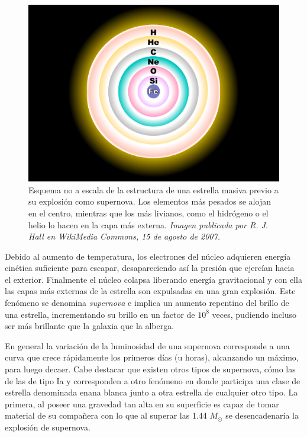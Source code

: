 \begin{figure}[h!]
\centering
\includegraphics[scale=.25]{images/sncore}
\caption{Esquema no a escala de la estructura de una estrella masiva previo a su explosi\'on como supernova. Los elementos m\'as pesados se alojan en el centro, mientras que  los m\'as livianos, como el hidr\'ogeno o el helio lo hacen en la capa m\'as externa. \textit{Imagen publicada por R. J. Hall en WikiMedia Commons, 15 de agosto de 2007.}}
\label{fig:f0}
\end{figure}


Debido al aumento de temperatura, los electrones del n\'ucleo adquieren energ\'ia cin\'etica suficiente para escapar, desapareciendo as\'i la presi\'on que ejerc\'ian hacia el exterior. Finalmente el n\'ucleo colapsa liberando energ\'ia gravitacional y con ella las capas m\'as externas de la estrella son expulsadas en una gran explosi\'on. Este fen\'omeno se denomina \textit{supernova} e implica un aumento repentino del brillo de una estrella, incrementando su brillo en un factor de $10^8$ veces, pudiendo incluso ser m\'as brillante que la galaxia que la alberga.
\bigskip

En general la variaci\'on de la luminosidad de una supernova corresponde a una curva que crece r\'apidamente los primeros d\'ias (u horas), alcanzando un m\'aximo, para luego decaer. Cabe destacar que existen otros tipos de supernova, c\'omo las de las de tipo Ia y corresponden a otro fen\'omeno en donde participa una clase de estrella denominada enana blanca junto a otra estrella de cualquier otro tipo. La primera, al poseer una gravedad tan alta en su superficie es capaz de tomar material de su compa\~nera con lo que al superar las 1.44 $M_{\odot}$ se desencadenar\'ia la explosi\'on de supernova. 
\bigskip

